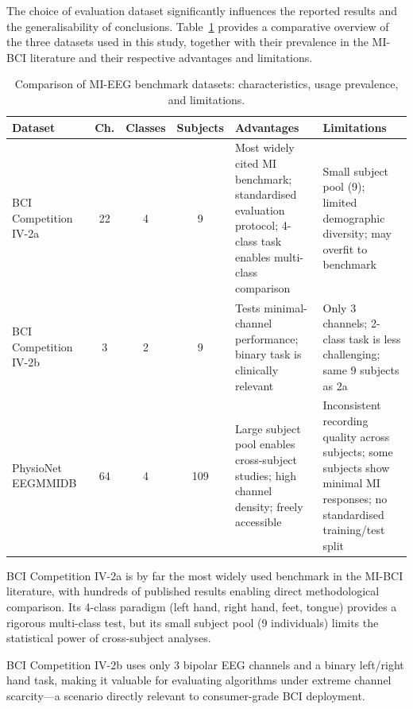 \documentclass[12pt, a4paper]{article}
\begin{document}
The choice of evaluation dataset significantly influences the reported results and the generalisability of conclusions. Table~\ref{tab:lit_datasets} provides a comparative overview of the three datasets used in this study, together with their prevalence in the MI-BCI literature and their respective advantages and limitations.

\begin{table}[htbp]
\centering
\caption{Comparison of MI-EEG benchmark datasets: characteristics, usage prevalence, and limitations.}
\label{tab:lit_datasets}
\begin{tabular}{@{} >{\raggedright\arraybackslash}p{2.8cm} c c c >{\raggedright\arraybackslash}p{3.5cm} >{\raggedright\arraybackslash}p{3.5cm} @{}}
\toprule
\textbf{Dataset} & \textbf{Ch.} & \textbf{Classes} & \textbf{Subjects} & \textbf{Advantages} & \textbf{Limitations} \\
\midrule
BCI Competition IV-2a~\cite{tangermann2012bci} & 22 & 4 & 9 & Most widely cited MI benchmark; standardised evaluation protocol; 4-class task enables multi-class comparison & Small subject pool (9); limited demographic diversity; may overfit to benchmark \\[6pt]
BCI Competition IV-2b~\cite{tangermann2012bci} & 3 & 2 & 9 & Tests minimal-channel performance; binary task is clinically relevant & Only 3 channels; 2-class task is less challenging; same 9 subjects as 2a \\[6pt]
PhysioNet EEGMMIDB~\cite{goldberger2000physiobank} & 64 & 4 & 109 & Large subject pool enables cross-subject studies; high channel density; freely accessible & Inconsistent recording quality across subjects; some subjects show minimal MI responses; no standardised training/test split \\
\bottomrule
\end{tabular}
\end{table}

BCI Competition IV-2a is by far the most widely used benchmark in the MI-BCI literature, with hundreds of published results enabling direct methodological comparison. Its 4-class paradigm (left hand, right hand, feet, tongue) provides a rigorous multi-class test, but its small subject pool (9 individuals) limits the statistical power of cross-subject analyses.

BCI Competition IV-2b uses only 3 bipolar EEG channels and a binary left/right hand task, making it valuable for evaluating algorithms under extreme channel scarcity---a scenario directly relevant to consumer-grade BCI deployment.
\end{document}
